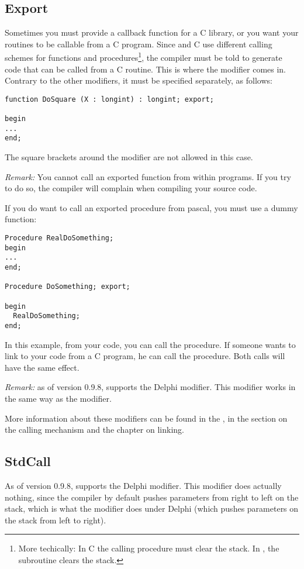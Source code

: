 \documentclass{report}
\begin{document}
\subsection{Export}
Sometimes you must provide a callback function for a C library, or you want
your routines to be callable from a C program. Since \fpk and C use
different calling schemes for functions and procedures\footnote{More
techically: In C the calling procedure must clear the stack. In \fpk, the
subroutine clears the stack.}, the compiler must be told to generate code
that can be called from a C routine. This is where the  modifier
comes in. Contrary to the other modifiers, it must be specified separately,
as follows:
\begin{verbatim}
function DoSquare (X : longint) : longint; export;

begin
...
end;
\end{verbatim} 
The square brackets around the modifier are not allowed in this case.

{\em Remark:} You cannot call an exported function from within \fpk programs.
If you try to do so, the compiler will complain when compiling your source
code.

If you do want to call an exported procedure from pascal, you must use a
dummy function:
\begin{verbatim}
Procedure RealDoSomething;
begin
...
end;

Procedure DoSomething; export;

begin
  RealDoSomething;
end; 
\end{verbatim}
In this example, from your \fpk code, you can call the 
procedure. If someone wants to link to your code from a C program, he can
call the  procedure. Both calls will have the same effect.

{\em Remark:}
as of version 0.9.8, \fpk supports the Delphi  modifier. 
This modifier works in the same way as the  modifier.

More information about these modifiers can be found in the \progref, in the
section on the calling mechanism and the chapter on linking.

\subsection{StdCall}
As of version 0.9.8, \fpk supports the Delphi  modifier.
This modifier does actually nothing, since the \fpk compiler by default 
pushes parameters from right to left on the stack, which is what the 
modifier does under Delphi (which pushes parameters on the stack from left to 
right).
\end{document}
